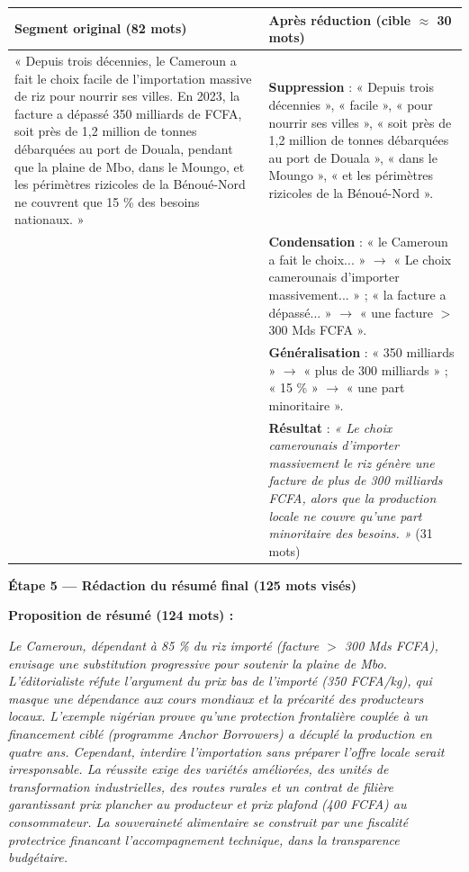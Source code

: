 \documentclass[11pt]{article}
\begin{document}
\begin{exoresolu}
\begin{center}
\begin{tabularx}{\linewidth}{|l|X|}\hline
\rowcolor{popblueL}
\textbf{Segment original (82 mots)} & \textbf{Après réduction (cible $\approx$ 30 mots)} \\ \hline
« Depuis trois décennies, le Cameroun a fait le choix facile de l'importation massive de riz pour nourrir ses villes. En 2023, la facture a dépassé 350 milliards de FCFA, soit près de 1,2 million de tonnes débarquées au port de Douala, pendant que la plaine de Mbo, dans le Moungo, et les périmètres rizicoles de la Bénoué-Nord ne couvrent que 15 \% des besoins nationaux. » & \textbf{Suppression} : « Depuis trois décennies », « facile », « pour nourrir ses villes », « soit près de 1,2 million de tonnes débarquées au port de Douala », « dans le Moungo », « et les périmètres rizicoles de la Bénoué-Nord ». \\
& \textbf{Condensation} : « le Cameroun a fait le choix... » $\to$ « Le choix camerounais d'importer massivement... » ; « la facture a dépassé... » $\to$ « une facture $>$ 300 Mds FCFA ». \\
& \textbf{Généralisation} : « 350 milliards » $\to$ « plus de 300 milliards » ; « 15 \% » $\to$ « une part minoritaire ». \\
& \textbf{Résultat} : \emph{« Le choix camerounais d'importer massivement le riz génère une facture de plus de 300 milliards FCFA, alors que la production locale ne couvre qu'une part minoritaire des besoins. »} (31 mots) \\ \hline
\end{tabularx}
\end{center}

\textbf{Étape 5 — Rédaction du résumé final (125 mots visés)}

\noindent \textbf{Proposition de résumé (124 mots) :}

\emph{Le Cameroun, dépendant à 85 \% du riz importé (facture $>$ 300 Mds FCFA), envisage une substitution progressive pour soutenir la plaine de Mbo. L'éditorialiste réfute l'argument du prix bas de l'importé (350 FCFA/kg), qui masque une dépendance aux cours mondiaux et la précarité des producteurs locaux. L'exemple nigérian prouve qu'une protection frontalière couplée à un financement ciblé (programme \emph{Anchor Borrowers}) a décuplé la production en quatre ans. Cependant, interdire l'importation sans préparer l'offre locale serait irresponsable. La réussite exige des variétés améliorées, des unités de transformation industrielles, des routes rurales et un contrat de filière garantissant prix plancher au producteur et prix plafond (400 FCFA) au consommateur. La souveraineté alimentaire se construit par une fiscalité protectrice financant l'accompagnement technique, dans la transparence budgétaire.}


\end{exoresolu}
\end{document}
